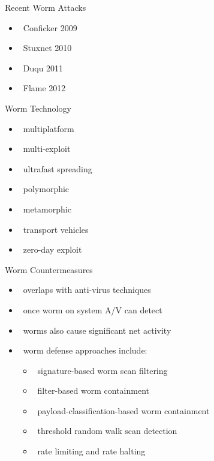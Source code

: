 \documentclass{beamer}
\begin{document}
\begin{frame}{Recent Worm Attacks}
  \begin{itemize}
  \item  Conficker 2009 
  \item  Stuxnet 2010 
  \item  Duqu 2011 
  \item  Flame 2012
  \end{itemize}
\end{frame}

\begin{frame}{Worm Technology}
  \begin{itemize}
  \item  multiplatform 
  \item  multi-exploit 
  \item  ultrafast spreading 
  \item  polymorphic 
  \item  metamorphic 
  \item  transport vehicles 
  \item  zero-day exploit
  \end{itemize}
\end{frame}
 
\begin{frame}{Worm Countermeasures}
  \begin{itemize}
  \item  overlaps with anti-virus techniques 
  \item  once worm on system A/V can detect 
  \item  worms also cause significant net activity 
  \item  worm defense approaches include: 
    \begin{itemize}
    \item  signature-based worm scan filtering 
    \item  filter-based worm containment 
    \item  payload-classification-based worm containment 
    \item  threshold random walk scan detection 
    \item  rate limiting and rate halting 
    \end{itemize}
  \end{itemize}
\end{frame}
\end{document}
